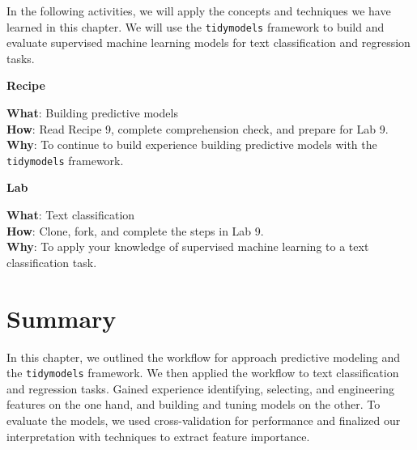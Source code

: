 \documentclass[
  letterpaper,
]{latex/krantz}
\theoremstyle{definition}
\theoremstyle{remark}
\begin{document}

In the following activities, we will apply the concepts and techniques
we have learned in this chapter. We will use the \texttt{tidymodels}
framework to build and evaluate supervised machine learning models for
text classification and regression tasks.

\begin{tcolorbox}[enhanced jigsaw, breakable, leftrule=.75mm, arc=.35mm, colframe=quarto-callout-color-frame, colback=white, left=2mm, bottomrule=.15mm, rightrule=.15mm, toprule=.15mm, opacityback=0]

\textbf{ Recipe}

\textbf{What}: Building predictive models\\
\textbf{How}: Read Recipe 9, complete comprehension check, and prepare
for Lab 9.\\
\textbf{Why}: To continue to build experience building predictive models
with the \texttt{tidymodels} framework.

\end{tcolorbox}

\begin{tcolorbox}[enhanced jigsaw, breakable, leftrule=.75mm, arc=.35mm, colframe=quarto-callout-color-frame, colback=white, left=2mm, bottomrule=.15mm, rightrule=.15mm, toprule=.15mm, opacityback=0]

\textbf{ Lab}

\textbf{What}: Text classification\\
\textbf{How}: Clone, fork, and complete the steps in Lab 9.\\
\textbf{Why}: To apply your knowledge of supervised machine learning to
a text classification task.

\end{tcolorbox}

\section*{Summary}\label{summary-8}


In this chapter, we outlined the workflow for approach predictive
modeling and the \texttt{tidymodels} framework. We then applied the
workflow to text classification and regression tasks. Gained experience
identifying, selecting, and engineering features on the one hand, and
building and tuning models on the other. To evaluate the models, we used
cross-validation for performance and finalized our interpretation with
techniques to extract feature importance.
\end{document}
